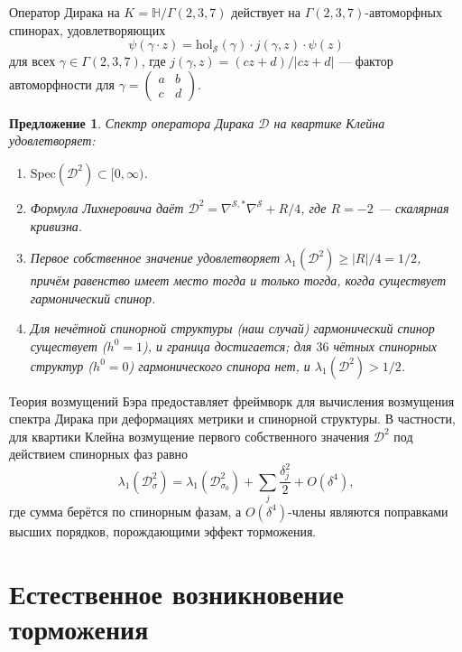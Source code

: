 \documentclass[12pt,a4paper]{article}
\newtheorem{proposition}[theorem]{Предложение}
\theoremstyle{definition}
\theoremstyle{remark}
\newcommand{\HH}{\mathbb{H}}
\newcommand{\hol}{\mathrm{hol}}
\newcommand{\Spec}{\mathrm{Spec}}
\newcommand{\cD}{\mathcal{D}}
\newcommand{\cS}{\mathcal{S}}
\begin{document}
Оператор Дирака на $K = \HH/\Gamma(2,3,7)$ действует на $\Gamma(2,3,7)$-автоморфных спинорах, удовлетворяющих
\begin{equation}
\psi(\gamma \cdot z) = \hol_{\cS}(\gamma) \cdot j(\gamma, z) \cdot \psi(z)
\end{equation}
для всех $\gamma \in \Gamma(2,3,7)$, где $j(\gamma, z) = (cz + d)/|cz + d|$ --- фактор автоморфности для $\gamma = \begin{pmatrix} a & b \\ c & d \end{pmatrix}$.

\begin{proposition}
Спектр оператора Дирака $\cD$ на квартике Клейна удовлетворяет:
\begin{enumerate}[label=(\roman*)]
\item $\Spec(\cD^2) \subset [0, \infty)$.
\item Формула Лихнеровича даёт $\cD^2 = \nabla^{\cS,*}\nabla^{\cS} + R/4$, где $R = -2$ --- скалярная кривизна.
\item Первое собственное значение удовлетворяет $\lambda_1(\cD^2) \geq |R|/4 = 1/2$, причём равенство имеет место тогда и только тогда, когда существует гармонический спинор.
\item Для нечётной спинорной структуры (наш случай) гармонический спинор существует ($h^0 = 1$), и граница достигается; для $36$ чётных спинорных структур ($h^0 = 0$) гармонического спинора нет, и $\lambda_1(\cD^2) > 1/2$.
\end{enumerate}
\end{proposition}

Теория возмущений Бэра \cite{Baer1992} предоставляет фреймворк для вычисления возмущения спектра Дирака при деформациях метрики и спинорной структуры. В частности, для квартики Клейна возмущение первого собственного значения $\cD^2$ под действием спинорных фаз равно
\begin{equation}
\lambda_1(\cD^2_{\sigma}) = \lambda_1(\cD^2_{\sigma_0}) + \sum_j \frac{\delta_j^2}{2} + O(\delta^4),
\end{equation}
где сумма берётся по спинорным фазам, а $O(\delta^4)$-члены являются поправками высших порядков, порождающими эффект торможения.

\section{Естественное возникновение торможения}
\label{sec:braking}
\end{document}
